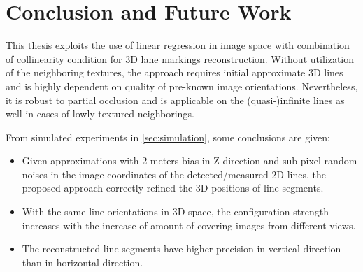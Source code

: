
\chapter{Conclusion and Future Work}
\label{chap:conclusion}

This thesis exploits the use of linear regression in image space with combination of collinearity condition for 3D lane markings reconstruction. Without utilization of the neighboring textures, the approach requires initial approximate 3D lines and is highly dependent on quality of pre-known image orientations. Nevertheless, it is robust to partial occlusion and is applicable on the (quasi-)infinite lines as well in cases of lowly textured neighborings. 

From simulated experiments in \cref{sec:simulation}, some conclusions are given:
\begin{itemize}
	\item Given approximations with 2 meters bias in Z-direction and sub-pixel random noises in the image coordinates of the detected/measured 2D lines, the proposed approach correctly refined the 3D positions of line segments.
	
	\item With the same line orientations in 3D space, the configuration strength increases with the increase of amount of covering images from different views.
	
	\item The reconstructed line segments have higher precision in vertical direction than in horizontal direction.
\end{itemize}


